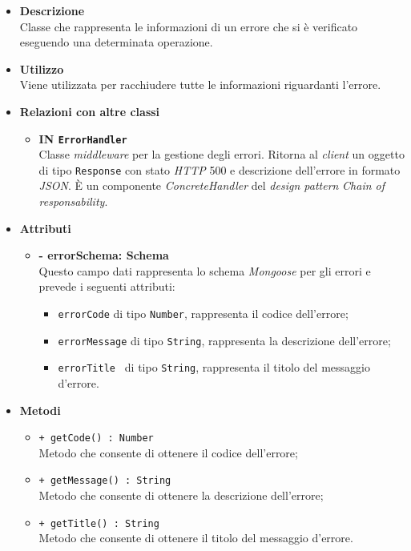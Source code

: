 \begin{itemize}
	\item \textbf{Descrizione} \\
	Classe che rappresenta le informazioni di un errore che si è verificato eseguendo una determinata operazione.
	\item \textbf{Utilizzo} \\
	Viene utilizzata per racchiudere tutte le informazioni riguardanti l'errore.
	\item \textbf{Relazioni con altre classi}
		\begin{itemize}
			\item \textbf{IN \texttt{ErrorHandler}} \\
			Classe \textit{middleware} per la gestione degli errori. Ritorna al \textit{client} un oggetto di tipo \texttt{Response} con stato \textit{HTTP} 500 e descrizione dell'errore in formato \textit{JSON}. È un componente \textit{ConcreteHandler} del \textit{design pattern} \textit{Chain of responsability}.
		\end{itemize}
	\item \textbf{Attributi}
		\begin{itemize}
			\item \textbf{- errorSchema: Schema} \\
			Questo campo dati rappresenta lo schema \textit{Mongoose} per gli errori e prevede i seguenti attributi:
				\begin{itemize}
					\item \texttt{errorCode} di tipo \texttt{Number}, rappresenta il codice dell'errore;
					\item \texttt{errorMessage} di tipo \texttt{String}, rappresenta la descrizione dell'errore; 
					\item \texttt{errorTitle	} di tipo \texttt{String}, rappresenta il titolo del messaggio d'errore.
				\end{itemize}
		\end{itemize}
	\item \textbf{Metodi}
		\begin{itemize}
			\item \texttt{+ getCode() : Number} \\
			Metodo che consente di ottenere il codice dell'errore;
			\item \texttt{+ getMessage() : String} \\
			Metodo che consente di ottenere la descrizione dell'errore;
			\item \texttt{+ getTitle() : String} \\
			Metodo che consente di ottenere il titolo del messaggio d'errore. 
		\end{itemize}
\end{itemize}